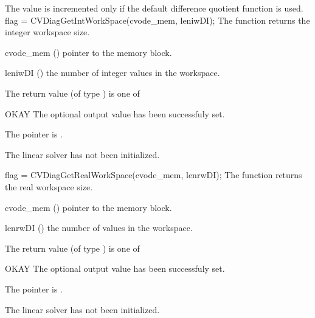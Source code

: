 {
  The value  is incremented only if the default 
   difference quotient function is used.
}
%
%
{
  flag = CVDiagGetIntWorkSpace(cvode\_mem, leniwDI);
}
{
  The function  returns the
  {\cvdiag} integer workspace size.
}
{
  \begin{args}
  \item[cvode\_mem] ()
    pointer to the {\cvode} memory block.
  \item[leniwDI] ()
    the number of integer values in the {\cvdiag} workspace.
  \end{args}
}
{
  The return value  (of type ) is one of
  \begin{args}
  \item[OKAY] 
    The optional output value has been successfuly set.
  \item[\Id{LIN\_NO\_MEM}]
    The  pointer is .
  \item[\Id{LIN\_NO\_LMEM}]
    The {\cvdiag} linear solver has not been initialized.
  \end{args}
}
{}
{
  flag = CVDiagGetRealWorkSpace(cvode\_mem, lenrwDI);
}
{
  The function  returns the
  {\cvdiag} real workspace size.
}
{
  \begin{args}
  \item[cvode\_mem] ()
    pointer to the {\cvode} memory block.
  \item[lenrwDI] ()
    the number of  values in the {\cvdiag} workspace.
  \end{args}
}
{
  The return value  (of type ) is one of
  \begin{args}
  \item[OKAY] 
    The optional output value has been successfuly set.
  \item[\Id{LIN\_NO\_MEM}]
    The  pointer is .
  \item[\Id{LIN\_NO\_LMEM}]
    The {\cvdiag} linear solver has not been initialized.
  \end{args}
}
